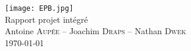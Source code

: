 \begin{titlepage}
\centering

\vspace*{\fill}

\texttt{[image: EPB.jpg]}~\\[0.75cm]
{\Large Rapport projet intégré}\\[0.3cm]

{\large Antoine \textsc{Aupée} -- Joachim \textsc{Draps} -- Nathan \textsc{Dwek}}\\[0.5cm]

{\small \today}
\vspace{5cm}

\vspace*{\fill}

\end{titlepage}
